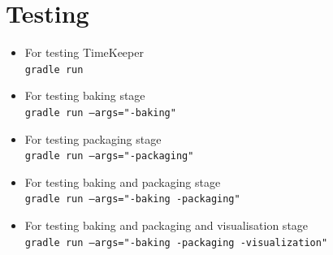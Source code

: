 \documentclass[12pt]{article}
\begin{document}
\section{Testing}%
\label{sec:testing}
\begin{itemize}
    \item For testing TimeKeeper \\\texttt{gradle run}
    \item For testing baking stage \\\texttt{gradle run --args="-baking"}
    \item For testing packaging stage \\\texttt{gradle run --args="-packaging"}
    \item For testing baking and packaging stage \\\texttt{gradle run --args="-baking -packaging"}
    \item For testing baking and packaging and visualisation stage \\\texttt{gradle run --args="-baking -packaging -visualization"}
\end{itemize}








\end{document}

